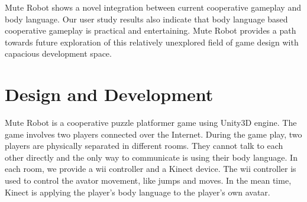\documentclass{chi-ext}
\begin{document}

Mute Robot shows a novel integration between current cooperative gameplay and body language. Our user study results also indicate that body language based cooperative gameplay is practical and entertaining. 
Mute Robot provides a path towards future exploration of this relatively unexplored field of game design with capacious development space.

 
  
\section{Design and Development}
Mute Robot is a cooperative puzzle platformer game using Unity3D\cite{Unity3D} engine. 
The game involves two players connected over the Internet. During the game play, two players are physically separated in different rooms. 
They cannot talk to each other directly and the only way to communicate is using their body language. 
In each room, we provide a wii\cite{Wii} controller and a Kinect\cite{Kinect} device. 
The wii controller is used to control the avator movement, like jumps and moves. 
In the mean time, Kinect is applying the player's body language to the player's own avatar. 
\end{document}
